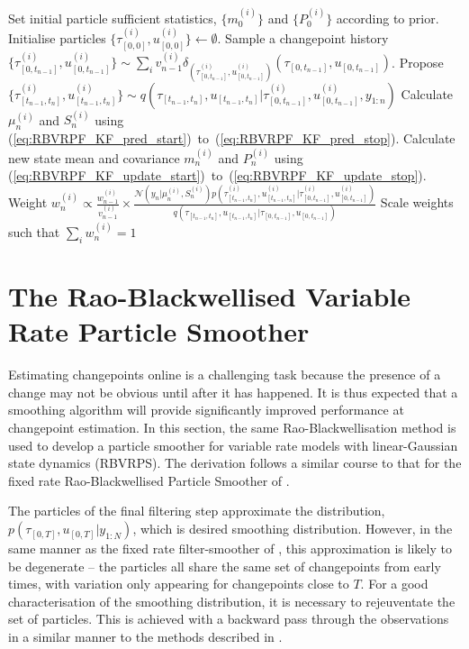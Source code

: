 \documentclass[journal]{IEEEtran}
\begin{document}
\begin{algorithmic}
\STATE Set initial particle sufficient statistics, $\{m_0^{(i)}\}$ and $\{P_0^{(i)}\}$ according to prior.
\STATE Initialise particles $\{\tau_{[0,0]}^{(i)}, u_{[0,0]}^{(i)}\} \gets \emptyset$.
  	\STATE Sample a changepoint history $\{\tau_{[0,t_{n-1}]}^{(i)}, u_{[0,t_{n-1}]}^{(i)}\} \sim \sum_i v_{n-1}^{(i)} \delta_{(\tau_{[0,t_{n-1}]}^{(i)}, u_{[0,t_{n-1}]}^{(i)})}(\tau_{[0,t_{n-1}]}, u_{[0,t_{n-1}]})$.
    \STATE Propose $\{\tau_{[t_{n-1},t_n]}^{(i)}, u_{[t_{n-1},t_n]}^{(i)}\} \sim q(\tau_{[t_{n-1},t_n]}, u_{[t_{n-1},t_n]}|\tau_{[0,t_{n-1}]}^{(i)}, u_{[0,t_{n-1}]}^{(i)}, y_{1:n})$
    \STATE Calculate $\mu_n^{(i)}$ and $S_n^{(i)}$ using (\ref{eq:RBVRPF_KF_pred_start})~to~(\ref{eq:RBVRPF_KF_pred_stop}).
    \STATE Calculate new state mean and covariance $m_n^{(i)}$ and $P_n^{(i)}$ using (\ref{eq:RBVRPF_KF_update_start})~to~(\ref{eq:RBVRPF_KF_update_stop}).
    \STATE Weight $w_n^{(i)} \propto \frac{w_{n-1}^{(i)}}{v_{n-1}^{(i)}} \times \frac{ \mathcal{N}(y_n|\mu_n^{(i)}, S_n^{(i)}) p(\tau_{[t_{n-1},t_n]}^{(i)}, u_{[t_{n-1},t_n]}^{(i)}|\tau_{[0,t_{n-1}]}^{(i)}, u_{[0,t_{n-1}]}^{(i)}) }{ q(\tau_{[t_{n-1},t_{n}]}, u_{[t_{n-1},t_{n}]}|\tau_{[0,t_{n-1}]}, u_{[0,t_{n-1}]}) }$
  \ENDFOR
  \STATE Scale weights such that $\sum_i w_n^{(i)}=1$
\ENDFOR
\end{algorithmic}



\section{The Rao-Blackwellised Variable Rate Particle Smoother} \label{sec:rbvrps}

Estimating changepoints online is a challenging task because the presence of a change may not be obvious until after it has happened. It is thus expected that a smoothing algorithm will provide significantly improved performance at changepoint estimation. In this section, the same Rao-Blackwellisation method is used to develop a particle smoother for variable rate models with linear-Gaussian state dynamics (RBVRPS). The derivation follows a similar course to that for the fixed rate Rao-Blackwellised Particle Smoother of \cite{Sarkka2012}.

The particles of the final filtering step approximate the distribution, $p(\tau_{[0,T]}, u_{[0,T]}|y_{1:N})$, which is desired smoothing distribution. However, in the same manner as the fixed rate filter-smoother of \cite{Kitagawa1996}, this approximation is likely to be degenerate -- the particles all share the same set of changepoints from early times, with variation only appearing for changepoints close to $T$. For a good characterisation of the smoothing distribution, it is necessary to rejeuventate the set of particles. This is achieved with a backward pass through the observations in a similar manner to the methods described in \cite{Godsill2004,Sarkka2012}.
\end{document}
